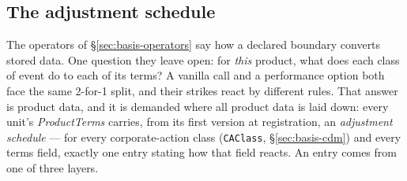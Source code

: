 \subsection{The adjustment schedule}
\label{sec:basis-schedule}

The operators of \S\ref{sec:basis-operators} say how a declared boundary converts
stored data. One question they leave open: for \emph{this} product, what does each
class of event do to each of its terms? A vanilla call and a performance option both
face the same 2-for-1 split, and their strikes react by different rules. That answer
is product data, and it is demanded where all product data is laid down: every
unit's \emph{ProductTerms} carries, from its first version at registration, an
\emph{adjustment schedule} --- for every corporate-action class (\texttt{CAClass},
\S\ref{sec:basis-cdm}) and every terms field, exactly one entry stating how that
field reacts. An entry comes from one of three layers.

